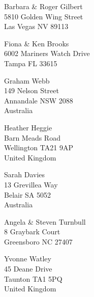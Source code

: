\documentclass{article}
\begin{document}
			
\begin{center}
\begin{Huge}

\vspace*{\fill}
Barbara \& Roger Gilbert\\
5810 Golden Wing Street\\
Las Vegas NV 89113\\
\vspace{\fill}

\clearpage

\vspace*{\fill}
Fiona \& Ken Brooks\\
6002 Mariners Watch Drive\\
Tampa FL 33615\\
\vspace{\fill}

\clearpage

\vspace*{\fill}
Graham Webb\\
149 Nelson Street\\
Annandale NSW 2088\\
Australia
\vspace{\fill}

\clearpage

\vspace*{\fill}
Heather Heggie\\
Barn Meads Road\\
Wellington TA21 9AP\\
United Kingdom
\vspace{\fill}

\clearpage

\vspace*{\fill}
Sarah Davies\\
13 Grevillea Way\\
Belair SA 5052\\
Australia
\vspace{\fill}

\clearpage

\vspace*{\fill}
Angela \& Steven Turnbull\\
8 Graybark Court\\
Greensboro NC 27407\\
\vspace{\fill}

\clearpage

\vspace*{\fill}
Yvonne Watley\\
45 Deane Drive\\
Taunton TA1 5PQ\\
United Kingdom
\vspace{\fill}


\end{Huge}
\end{center}
\end{document}

